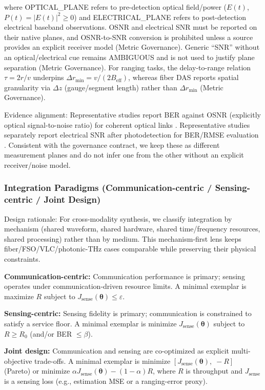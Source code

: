 \documentclass[letterpaper,journal]{IEEEtran}
\begin{document}
where OPTICAL\_PLANE refers to pre-detection optical field/power (\(E(t)\), \(P(t)=|E(t)|^2\ge 0\)) and ELECTRICAL\_PLANE refers to post-detection electrical baseband observations. OSNR and electrical SNR must be reported on their native planes, and OSNR-to-SNR conversion is prohibited unless a source provides an explicit receiver model (Metric Governance). Generic ``SNR'' without an optical/electrical cue remains AMBIGUOUS and is not used to justify plane separation (Metric Governance). For ranging tasks, the delay-to-range relation \(\tau=2r/v\) underpins \(\Delta r_{\min}=v/(2B_{\text{eff}})\), whereas fiber DAS reports spatial granularity via \(\Delta z\) (gauge/segment length) rather than \(\Delta r_{\min}\) (Metric Governance).

Evidence alignment: Representative studies report BER against OSNR (explicitly optical signal-to-noise ratio) for coherent optical links \cite{O_ISAC_132,O_ISAC_076}.
Representative studies separately report electrical SNR after photodetection for BER/RMSE evaluation \cite{O_ISAC_061,O_ISAC_100,O_ISAC_023}. Consistent with the governance contract, we keep these as different measurement planes and do not infer one from the other without an explicit receiver/noise model.

\subsubsection{Integration Paradigms (Communication-centric / Sensing-centric / Joint Design)}
Design rationale: For cross-modality synthesis, we classify integration by mechanism (shared waveform, shared hardware, shared time/frequency resources, shared processing) rather than by medium. This mechanism-first lens keeps fiber/FSO/VLC/photonic-THz cases comparable while preserving their physical constraints.


\textbf{Communication-centric:} Communication performance is primary; sensing operates under communication-driven resource limits. A minimal exemplar is maximize \(R\) subject to \(J_{\text{sense}}(\boldsymbol{\theta})\le \varepsilon\).

\textbf{Sensing-centric:} Sensing fidelity is primary; communication is constrained to satisfy a service floor. A minimal exemplar is minimize \(J_{\text{sense}}(\boldsymbol{\theta})\) subject to \(R\ge R_0\) (and/or BER \(\le \beta\)).

\textbf{Joint design:} Communication and sensing are co-optimized as explicit multi-objective trade-offs. A minimal exemplar is minimize \([J_{\text{sense}}(\boldsymbol{\theta}),\; -R]\) (Pareto) or minimize \(\alpha J_{\text{sense}}(\boldsymbol{\theta})-(1-\alpha)R\), where \(R\) is throughput and \(J_{\text{sense}}\) is a sensing loss (e.g., estimation MSE or a ranging-error proxy).
\end{document}
